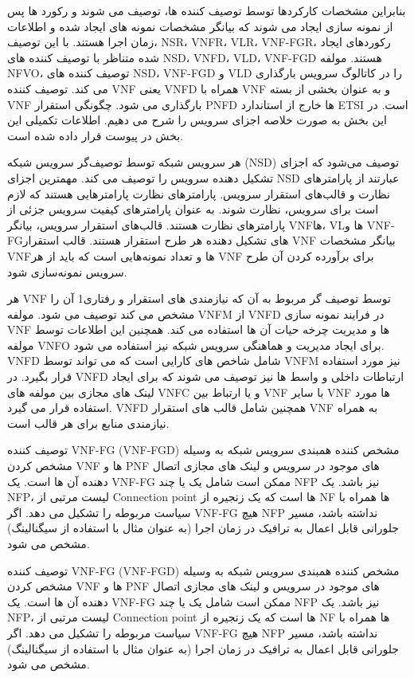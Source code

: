 \documentclass{book}
\begin{document}
بنابراین مشخصات کارکردها توسط توصیف کننده ها، توصیف می شوند و رکورد ها پس از نمونه سازی ایجاد می شوند که بیانگر مشخصات نمونه های ایجاد شده و اطلاعات زمان اجرا هستند. با این توصیف، NSR، VNFR، VLR، VNF-FGR، رکوردهای ایجاد شده متناظر با توصیف کننده های NSD، VNFD، VLD، VNF-FGD هستند. مولفه NFVO، توصیف کننده های NSD، VNF-FGD و VLD را در کاتالوگ سرویس بارگذاری می کند. توصیف کننده VNF یعنی VNFD همراه با VNF و به عنوان بخشی از بسته VNF بارگذاری می شود. چگونگی استقرار PNFD ها خارج از استاندارد ETSI است. در این بخش به صورت خلاصه اجزای سرویس را شرح می دهیم. اطلاعات تکمیلی این بخش در پیوست قرار داده شده است.


هر سرویس شبکه توسط توصیف‌گر سرویس شبکه (NSD) توصیف می‌شود که اجزای تشکیل دهنده سرویس را توصیف می کند. مهمترین  اجزای NSD عبارتند از
پارامترهای نظارت و قالب‌های استقرار سرویس.
پارامترهای نظارت پارامترهایی هستند که لازم است برای سرویس، نظارت شوند.
به عنوان پارامترهای کیفیت سرویس جزئی از پارامترهای نظارت هستند. قالب‌های استقرار سرویس، بیانگر VNFها، VLها و VNF-FGهای تشکیل دهنده هر طرح استقرار هستند.
قالب استقرار VNF بیانگر مشخصات VNFها و تعداد نمونه‌هایی است که باید از هر VNF برای برآورده کردن آن طرح سرویس نمونه‌سازی شود.


هر VNF توسط توصیف گر مربوط به آن که نیازمندی های استقرار و رفتاری1 آن را مشخص می کند توصیف می شود. مولفه VNFM از VNFD در فرایند نمونه سازی VNF ها و مدیریت چرخه حیات آن ها استفاده می کند. همچنین این اطلاعات توسط مولفه VNFO برای ایجاد مدیریت و هماهنگی سرویس شبکه نیز استفاده می شود. VNFD شامل شاخص های کارایی است که می تواند توسط VNFM نیز مورد استفاده قرار بگیرد. در VNFD ارتباطات داخلی و واسط ها نیز توصیف می شوند که برای ایجاد لینک های مجازی بین مولفه های VNFC و یا ارتباط بین VNF با سایر VNF ها مورد استفاده قرار می گیرد. VNFD همچنین شامل قالب های استقرار VNF به همراه نیازمندی منابع برای هر قالب است.


توصیف کننده VNF-FG (VNF-FGD) مشخص کننده همبندی سرویس شبکه به وسیله مشخص کردن VNF ها و PNF های موجود در سرویس و لینک های مجازی اتصال دهنده آن ها است. یک VNF-FG ممکن است شامل یک یا چند NFP نیز باشد. یک NFP، لیست مرتبی از Connection point ها است که یک زنجیره از NF ها همراه با سیاست مربوطه را تشکیل می دهد. اگر VNF-FG هیچ NFP نداشته باشد، مسیر جلورانی قابل اعمال به ترافیک در زمان اجرا (به عنوان مثال با استفاده از سیگنالینگ) مشخص می شود.

توصیف کننده VNF-FG (VNF-FGD) مشخص کننده همبندی سرویس شبکه به وسیله مشخص کردن VNF ها و PNF های موجود در سرویس و لینک های مجازی اتصال دهنده آن ها است. یک VNF-FG ممکن است شامل یک یا چند NFP نیز باشد. یک NFP، لیست مرتبی از Connection point ها است که یک زنجیره از NF ها همراه با سیاست مربوطه را تشکیل می دهد. اگر VNF-FG هیچ NFP نداشته باشد، مسیر جلورانی قابل اعمال به ترافیک در زمان اجرا (به عنوان مثال با استفاده از سیگنالینگ) مشخص می شود.
\end{document}
